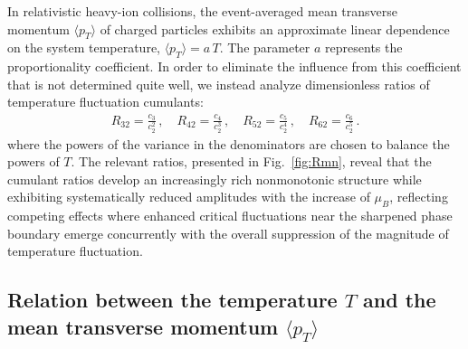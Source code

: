 \documentclass[aps,twocolumn,prd,superscriptaddress,nofootinbib,floatfix]{revtex4-2}
\begin{document}
{In relativistic heavy-ion collisions, the event-averaged mean transverse momentum $\langle p_{T} \rangle$ of charged particles exhibits an approximate linear dependence on the system temperature, $\langle p_{T} \rangle = a\,T$. The parameter $a$ represents the proportionality coefficient. In order to eliminate the influence from this coefficient that is not determined quite well, we instead analyze dimensionless ratios of temperature fluctuation cumulants: 
\begin{align}
    R_{32}=\frac{c_3}{c_2^2}\,, \quad R_{42}=\frac{c_4}{c_2^3}\,,\quad R_{52}=\frac{c_5}{c_2^4}\,,\quad R_{62}=\frac{c_6}{c_2^5}\,.\label{eq:R32R42}
\end{align}
where the powers of the variance in the denominators are chosen to balance the powers of $T$. The relevant ratios, presented in Fig.~\ref{fig:Rmn}, reveal that the cumulant ratios develop an increasingly rich nonmonotonic structure while exhibiting systematically reduced amplitudes with the increase of $\mu_B$, reflecting competing effects where enhanced critical fluctuations near the sharpened phase boundary emerge concurrently with the overall suppression of the magnitude of temperature fluctuation. 

\subsection{Relation between the temperature $T$ and the mean transverse momentum $\langle p_{T} \rangle$}
\label{app:T-pT-relation}

}
\end{document}
